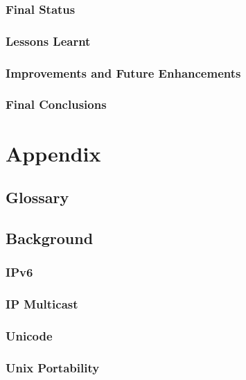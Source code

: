 \documentclass[a4paper,12pt]{report}
\begin{document}
\section{Final Status}

\section{Lessons Learnt}

\section{Improvements and Future Enhancements}



\section{Final Conclusions}


\part*{Appendix}

\appendix


\chapter{Glossary}




\chapter{Background}

\section{IPv6}



\section{IP Multicast}

\section{Unicode}

\section{Unix Portability}
\end{document}
